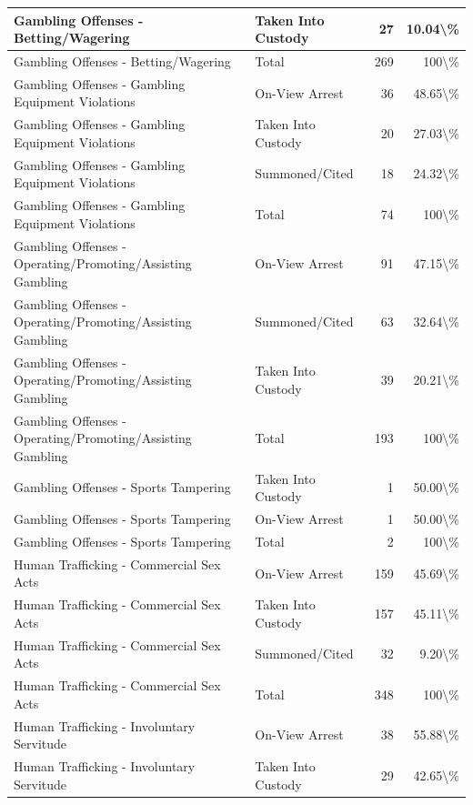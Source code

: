 \documentclass[
]{krantz}
\begin{document}
\begin{longtable}[t]{l|l|r|r}
\hline
Gambling Offenses - Betting/Wagering & Taken Into Custody & 27 & 10.04\textbackslash{}\%\\
\hline
Gambling Offenses - Betting/Wagering & Total & 269 & 100\textbackslash{}\%\\
\hline
Gambling Offenses - Gambling Equipment Violations & On-View Arrest & 36 & 48.65\textbackslash{}\%\\
\hline
Gambling Offenses - Gambling Equipment Violations & Taken Into Custody & 20 & 27.03\textbackslash{}\%\\
\hline
Gambling Offenses - Gambling Equipment Violations & Summoned/Cited & 18 & 24.32\textbackslash{}\%\\
\hline
Gambling Offenses - Gambling Equipment Violations & Total & 74 & 100\textbackslash{}\%\\
\hline
Gambling Offenses - Operating/Promoting/Assisting Gambling & On-View Arrest & 91 & 47.15\textbackslash{}\%\\
\hline
Gambling Offenses - Operating/Promoting/Assisting Gambling & Summoned/Cited & 63 & 32.64\textbackslash{}\%\\
\hline
Gambling Offenses - Operating/Promoting/Assisting Gambling & Taken Into Custody & 39 & 20.21\textbackslash{}\%\\
\hline
Gambling Offenses - Operating/Promoting/Assisting Gambling & Total & 193 & 100\textbackslash{}\%\\
\hline
Gambling Offenses - Sports Tampering & Taken Into Custody & 1 & 50.00\textbackslash{}\%\\
\hline
Gambling Offenses - Sports Tampering & On-View Arrest & 1 & 50.00\textbackslash{}\%\\
\hline
Gambling Offenses - Sports Tampering & Total & 2 & 100\textbackslash{}\%\\
\hline
Human Trafficking - Commercial Sex Acts & On-View Arrest & 159 & 45.69\textbackslash{}\%\\
\hline
Human Trafficking - Commercial Sex Acts & Taken Into Custody & 157 & 45.11\textbackslash{}\%\\
\hline
Human Trafficking - Commercial Sex Acts & Summoned/Cited & 32 & 9.20\textbackslash{}\%\\
\hline
Human Trafficking - Commercial Sex Acts & Total & 348 & 100\textbackslash{}\%\\
\hline
Human Trafficking - Involuntary Servitude & On-View Arrest & 38 & 55.88\textbackslash{}\%\\
\hline
Human Trafficking - Involuntary Servitude & Taken Into Custody & 29 & 42.65\textbackslash{}\%\\

\end{longtable}
\end{document}

